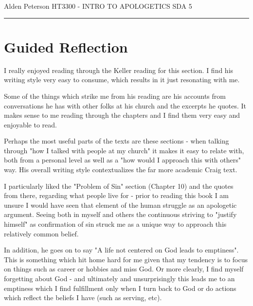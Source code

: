 \documentclass[12pt]{turabian-researchpaper}
\begin{document}
\begin{singlespace}
\noindent Alden Peterson \newline
\noindent HT3300 - INTRO TO APOLOGETICS \newline
\noindent SDA 5 \newline
\noindent\rule{4cm}{0.4pt}
\end{singlespace}

\section{Guided Reflection}

I really enjoyed reading through the Keller reading for this section. I find his writing style very easy to consume, which results in it just resonating with me.

Some of the things which strike me from his reading are his accounts from conversations he has with other folks at his church and the excerpts he quotes. It makes sense to me reading through the chapters and I find them very easy and enjoyable to read.

Perhaps the most useful parts of the texts are these sections - when talking through "how I talked with people at my church" it makes it easy to relate with, both from a personal level as well as a "how would I approach this with others" way. His overall writing style contextualizes the far more academic Craig text.

I particularly liked the "Problem of Sin" section (Chapter 10\autocite[pg.165]{keller2008reason}) and  the quotes from there, regarding what people live for - prior to reading this book I am unsure I would have seen that element of the human struggle as an apologetic argument. Seeing both in myself and others the continuous striving to "justify himself"\autocite[pg.167]{keller2008reason} as confirmation of sin struck me as a unique way to approach this relatively common belief.

In addition, he goes on to say "A life not centered on God leads to emptiness\autocite[pg.173]{keller2008reason}". This is something which hit home hard for me given that my tendency is to focus on things such as career or hobbies and miss God. Or more clearly, I find myself forgetting about God - and ultimately and unsurprisingly this leads me to an emptiness which I find fulfillment only when I turn back to God or do actions which reflect the beliefs I have (such as serving, etc).
\end{document}
